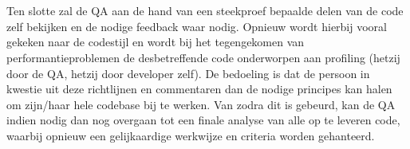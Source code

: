 \documentclass{article}
\begin{document}
\\\\
Ten slotte zal de QA aan de hand van een steekproef bepaalde delen van de code zelf bekijken en de nodige feedback waar nodig. Opnieuw wordt hierbij vooral gekeken naar de codestijl en wordt bij het tegengekomen van performantieproblemen de desbetreffende code onderworpen aan profiling (hetzij door de QA, hetzij door developer zelf). De bedoeling is dat de persoon in kwestie uit deze richtlijnen en commentaren dan de nodige principes kan halen om zijn/haar hele codebase bij te werken. Van zodra dit is gebeurd, kan de QA indien nodig dan nog overgaan tot een finale analyse van alle op te leveren code, waarbij opnieuw een gelijkaardige werkwijze en criteria worden gehanteerd.
%
\clearpage
%
\end{document}

